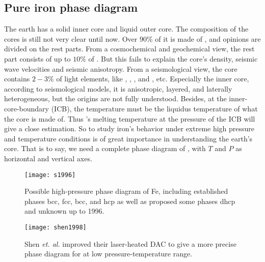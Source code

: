 
\subsection{Pure iron phase diagram}
\label{ssec:phase}

The earth has a solid inner core and liquid outer core.
The composition of the cores is still not very clear until now.
Over $90\%$ of it is made of ,
and opinions are divided on the rest parts.
From a cosmochemical and geochemical view,
the rest part consists of up to $10\%$ of \cite{McDonough:1995iz}.
But this fails to explain the core's
density, seismic wave velocities
and seismic anisotropy.
From a seismological view, the core contains
$2-3\%$ of light elements, like , , ,  and , etc.
Especially the inner core,
according to seismological models, it is anisotropic, layered, and laterally heterogeneous, but the origins are not fully understood.
Besides,
at the inner-core-boundary (ICB),
the temperature must be the liquidus temperature of what the core is made of.
Thus 's melting temperature at the pressure of
the ICB will give a close estimation.
So to study iron's behavior under extreme high pressure and temperature
conditions is of great importance in understanding the earth's core.
That is to say, we need a complete phase diagram of , with
$T$ and $P$ as horizontal and vertical axes.

\begin{figure}[h]
	\centering
	\begin{minipage}[t]{.5\linewidth}
		\centering
		\texttt{[image: s1996]}
		\caption{Possible high-pressure phase diagram of Fe, including established phases    bcc, fcc, bcc, and hcp as well as proposed some phases dhcp and unknown up to
			1996\cite{Soderlind:1996du}.}
		\label{fig:fepd:a}
	\end{minipage}%
	\hfil
	\begin{minipage}[t]{.5\linewidth}
		\centering
		\texttt{[image: shen1998]}
		\caption{Shen \textit{et. al.}\cite{Shen:1998bt}
			improved their laser-heated DAC to give a
			more precise phase diagram for  at low pressure-temperature range.}
		\label{fig:fepd:b}
	\end{minipage}
\end{figure}

